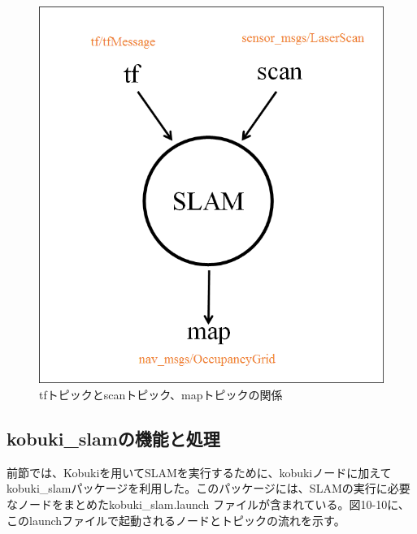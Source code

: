 \begin{figure}[htp]
  \centering
  \includegraphics[width=\columnwidth]{pictures/chapter10/pic_10_09.png}
  \caption{tfトピックとscanトピック、mapトピックの関係}
\end{figure}

\subsection{kobuki\_slamの機能と処理}

前節では、Kobukiを用いてSLAMを実行するために、kobukiノードに加えてkobuki\_slamパッケージを利用した。このパッケージには、SLAMの実行に必要なノードをまとめたkobuki\_slam.launch ファイルが含まれている。図10-10に、このlaunchファイルで起動されるノードとトピックの流れを示す。

